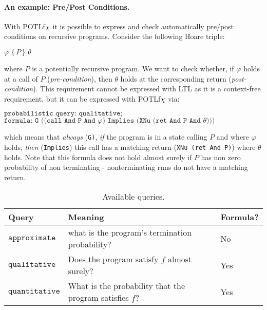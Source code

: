 \documentclass[9pt,a4paper]{article}
\begin{document}
\paragraph{An example: Pre/Post Conditions.}
With POTLf$\chi$ it is possible to express and check automatically pre/post conditions on recursive programs. Consider the following Hoare triple:
\begin{center}
    $\varphi \, \, \{ \, P \, \} \,\, \theta$
\end{center}
where $P$ is a potentially recursive program. We want to check whether, if $\varphi$ holds at a call of $P$ (\emph{pre-condition}), then $\theta$ holds at the corresponding return (\emph{post-condition}). This requirement cannot be expressed with LTL as it is a context-free requirement, but it can be expressed with POTLf$\chi$ via: 
\begin{center}
    $\texttt{probabilistic query: qualitative;}$
    $\texttt{formula: G ((call And P And } \varphi \texttt{) Implies (XNu (ret And P And } \theta \texttt{)))}$
\end{center}
which means that \emph{always} (\texttt{G)}, \emph{if} the program is in a state calling $P$ and where $\varphi$ holds, \emph{then} (\texttt{Implies}) this call has a matching return (\texttt{XNu (ret And P)}) where $\theta$ holds. Note that this formula does not hold almost surely if $P$ has non zero probability of non terminating - nonterminating runs do not have a matching return.

\begin{table}
\centering
\begin{tabular}{| l | l | l |}
\hline
 Query & Meaning & Formula? \\
\hline
\hline
$\texttt{approximate}$ & what is the program's termination probability? & No \\ 
$\texttt{qualitative}$ & Does the program satisfy $f$ almost surely? & Yes \\ 
$\texttt{quantitative}$ & What is the probability that the program satisfies $f$? & Yes \\ 
\hline
\end{tabular}
\caption{Available queries.}
\label{tab:queries}
\end{table}
\end{document}
